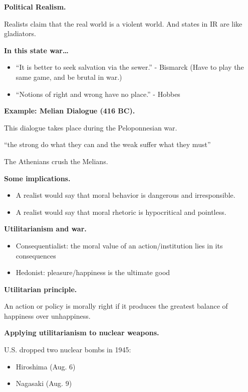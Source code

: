 \documentclass{article}
\begin{document}
{\bf Political Realism.}

Realists claim that the real world is a violent world.  And states in IR are like gladiators.

{\bf In this state war\ldots}

\begin{itemize}
  \item ``It is better to seek salvation via the sewer.'' - Bismarck (Have to play the same game, and be brutal in war.)
  \item ``Notions of right and wrong have no place.'' - Hobbes
\end{itemize}

{\bf Example: Melian Dialogue (416 BC).}

This dialogue takes place during the Peloponnesian war.

``the strong do what they can and the weak suffer what they must''

The Athenians crush the Melians.

{\bf Some implications.}

\begin{itemize}
  \item A realist would say that moral behavior is dangerous and irresponsible.
  \item A realist would say that moral rhetoric is hypocritical and pointless.
\end{itemize}

{\bf Utilitarianism and war.}

\begin{itemize}
  \item Consequentialist: the moral value of an action/institution lies in its consequences
  \item Hedonist: pleasure/happiness is the ultimate good
\end{itemize}

{\bf Utilitarian principle.}

An action or policy is morally right if it produces the greatest balance of happiness over unhappiness.

{\bf Applying utilitarianism to nuclear weapons.}

U.S. dropped two nuclear bombs in 1945:

\begin{itemize}
  \item Hiroshima (Aug. 6)
  \item Nagasaki (Aug. 9)
\end{itemize}
\end{document}
